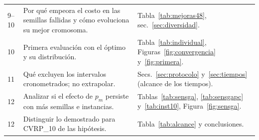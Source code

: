 \documentclass[11pt,a4paper]{article}
\numberwithin{equation}{section}
\begin{document}
\begin{longtable}{p{1.4cm}p{7.2cm}p{6.6cm}}
9--10 & Por qué empeora el costo en las semillas fallidas y cómo evoluciona su mejor cromosoma. & Tabla~\ref{tab:mejoras48}, sec.~\ref{sec:diversidad}.\\
10 & Primera evaluación con el óptimo y su distribución. & Tabla~\ref{tab:individual}, Figuras~\ref{fig:convergencia} y~\ref{fig:primera}.\\
11 & Qué excluyen los intervalos cronometrados; no extrapolar. & Secs.~\ref{sec:protocolo} y~\ref{sec:tiempos} (alcance de los tiempos).\\
12 & Analizar si el efecto de \(p_m\) persiste con más semillas e instancias. & Tablas~\ref{tab:sensga}, \ref{tab:sensgapc} y~\ref{tab:inst10}, Figura~\ref{fig:sensga}.\\
12 & Distinguir lo demostrado para CVRP\_10 de las hipótesis. & Tabla~\ref{tab:alcance} y conclusiones.\\\bottomrule
\end{longtable}
\end{document}

